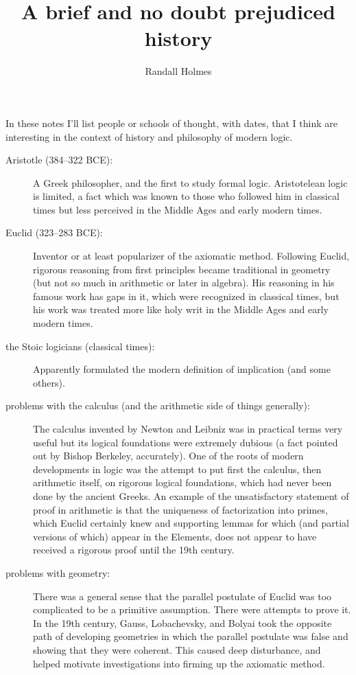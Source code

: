 \documentclass[12pt]{article}
\title{A brief and no doubt prejudiced history}
\author{Randall Holmes}
\begin{document}
\maketitle

In these notes I'll list people or schools of thought, with dates, that I think are interesting in the context of history and philosophy of modern logic.

\begin{description}

\item[Aristotle (384–322 BCE):]  A Greek philosopher, and the first to study formal logic.  Aristotelean logic is limited, a fact which was known to those who followed him in classical times
but less perceived in the Middle Ages and early modern times.

\item[Euclid (323–283 BCE):]  Inventor or at least popularizer of the axiomatic method.  Following Euclid, rigorous reasoning from first principles became traditional in geometry
(but not so much in arithmetic or later in algebra).  His reasoning in his famous work has gaps in it, which were recognized in classical times, but his work was treated more like holy writ in the Middle Ages and early modern times.

\item[the Stoic logicians (classical times):]  Apparently formulated the modern definition of implication (and some others).

\item[problems with the calculus (and the arithmetic side of things generally):]  The calculus invented by Newton and Leibniz was in practical terms very useful but its logical foundations were extremely dubious (a fact pointed out by Bishop Berkeley, accurately).  One of the roots of modern developments in logic was the attempt to put first the calculus, then arithmetic itself, on rigorous logical foundations, which had never been done by the ancient Greeks.  An example of the unsatisfactory statement of proof in arithmetic is that the uniqueness of factorization into primes, which Euclid certainly knew and supporting lemmas for which (and  partial versions of which) appear in the Elements, does not appear to have received a rigorous proof until the 19th century.

\item[problems with geometry:]  There was a general sense that the parallel postulate of Euclid was too complicated to be a primitive assumption.  There were attempts to prove it.
In the 19th century, Gauss, Lobachevsky, and Bolyai took the opposite path of developing geometries in which the parallel postulate was false and showing that they were coherent.
This caused deep disturbance, and helped motivate investigations into firming up the axiomatic method.


\end{description}
\end{document}

